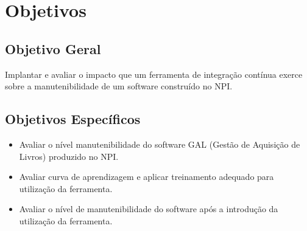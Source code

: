 \chapter{Objetivos}\label{objetivos}
\section{Objetivo Geral}\label{objetivoger}
Implantar e avaliar o impacto que um ferramenta de integração contínua exerce sobre a manutenibilidade de um software construído no NPI.

\section{Objetivos Específicos}

\begin{itemize}
\item Avaliar o nível manutenibilidade do software GAL (Gestão de Aquisição de Livros) produzido no NPI.
\item Avaliar curva de aprendizagem e aplicar treinamento adequado para utilização da ferramenta.
\item Avaliar o nível de manutenibilidade do software após a introdução da utilização da ferramenta.
\end{itemize}